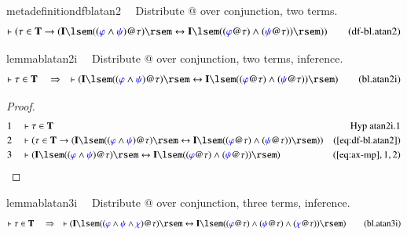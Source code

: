 \begin{restatable}{metadefinition}{dfblatan2}~~ Distribute @ over conjunction, two
terms.
\begin{align}
\vdash ( \tau \in \mathbf{T} \rightarrow ( \mathbf{I} \lsem ( ( \mw{\varphi}
    \wedge \mw{\psi} ) @ \tau ) \rsem \leftrightarrow \mathbf{I} \lsem ( (
    \mw{\varphi} @ \tau ) \wedge ( \mw{\psi} @ \tau ) ) \rsem )
    )\label{eq:df-bl.atan2}\tag{df-bl.atan2}
\end{align}
\end{restatable}

\begin{restatable}{lemma}{blatan2i}~~ Distribute @ over conjunction, two terms,
inference.
\begin{align}
\vdash \tau \in \mathbf{T}\quad\Rightarrow\quad \vdash ( \mathbf{I} \lsem ( (
    \mw{\varphi} \wedge \mw{\psi} ) @ \tau ) \rsem \leftrightarrow \mathbf{I}
    \lsem ( ( \mw{\varphi} @ \tau ) \wedge ( \mw{\psi} @ \tau ) ) \rsem
    )\label{eq:bl.atan2i}\tag{bl.atan2i}
\end{align}
\end{restatable}

\begin{proof}
\begin{align}
  1 &&  & \vdash \tau \in \mathbf{T}&\text{Hyp~atan2i.1}\notag%
  \\ 2 &&  & \vdash ( \tau \in \mathbf{T} \rightarrow ( \mathbf{I} \lsem ( (
      \mw{\varphi} \wedge \mw{\psi} ) @ \tau ) \rsem
      \leftrightarrow \mathbf{I} \lsem ( ( \mw{\varphi} @
      \tau ) \wedge ( \mw{\psi} @ \tau ) ) \rsem )
      )&(\mbox{\ref{eq:df-bl.atan2}})\notag
  \\ 3 &&  & \vdash ( \mathbf{I} \lsem ( ( \mw{\varphi} \wedge \mw{\psi} ) @
      \tau ) \rsem \leftrightarrow \mathbf{I} \lsem ( (
      \mw{\varphi} @ \tau ) \wedge ( \mw{\psi} @ \tau ) )
      \rsem )&(\mbox{\ref{eq:ax-mp}},1,2)\notag
\end{align}
\end{proof}

\begin{restatable}{lemma}{blatan3i}~~ Distribute @ over conjunction, three
terms, inference.
\begin{align}
\vdash \tau \in \mathbf{T}\quad\Rightarrow\quad \vdash ( \mathbf{I} \lsem ( (
    \mw{\varphi} \wedge \mw{\psi} \wedge \mw{\chi} ) @ \tau ) \rsem
    \leftrightarrow \mathbf{I} \lsem ( ( \mw{\varphi} @ \tau ) \wedge (
    \mw{\psi} @ \tau ) \wedge ( \mw{\chi} @ \tau ) ) \rsem
    )\label{eq:bl.atan3i}\tag{bl.atan3i}
\end{align}
\end{restatable}


